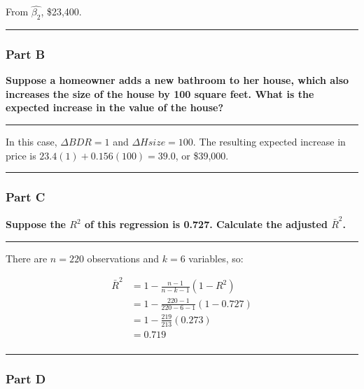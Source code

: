 \documentclass[
]{article}
\begin{document}
From \(\hat{\beta_2}\), \$23,400.

\begin{center}\rule{0.5\linewidth}{0.5pt}\end{center}

\hypertarget{part-b}{%
\subsubsection{Part B}\label{part-b}}

\textbf{Suppose a homeowner adds a new bathroom to her house, which also
increases the size of the house by 100 square feet. What is the expected
increase in the value of the house?}

\begin{center}\rule{0.5\linewidth}{0.5pt}\end{center}

In this case, \(\Delta BDR=1\) and \(\Delta Hsize=100\). The resulting
expected increase in price is \(23.4(1)+0.156(100)=39.0\), or \$39,000.

\begin{center}\rule{0.5\linewidth}{0.5pt}\end{center}

\hypertarget{part-c}{%
\subsubsection{Part C}\label{part-c}}

\textbf{Suppose the \(R^2\) of this regression is 0.727. Calculate the
adjusted \(\bar{R}^2\).}

\begin{center}\rule{0.5\linewidth}{0.5pt}\end{center}

There are \(n=220\) observations and \(k=6\) variables, so:

\[\begin{align*}
\bar{R}^2&=1-\frac{n-1}{n-k-1}(1-R^2)\\
&=1-\frac{220-1}{220-6-1}(1-0.727)\\
&=1-\frac{219}{213}(0.273)\\
&=0.719\\
\end{align*}\]

\begin{center}\rule{0.5\linewidth}{0.5pt}\end{center}

\hypertarget{part-d}{%
\subsubsection{Part D}\label{part-d}}
\end{document}
